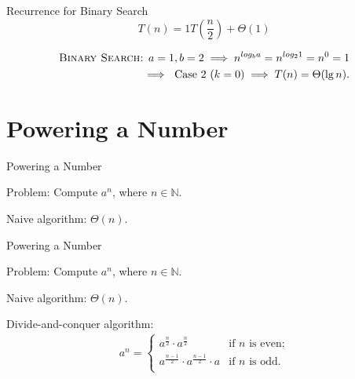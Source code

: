 \documentclass{beamer}
\begin{document}
\begin{frame}{Recurrence for Binary Search}
    $$
        T(n) = 1T\left(\frac{n}{2}\right) + \Theta(1)
    $$
    \vspace{20mm}
    \begin{align*}
        \text{\textsc{Binary Search:} } a = 1, b = 2 \implies n^{log_b a} = n^{log_2 1} = n^0 = 1 \\ \implies \text{ Case 2 } (k = 0) \implies T(n) = \Theta(\lg n) \text{.}
    \end{align*}
\end{frame}

\section{Powering a Number}

\begin{frame}{Powering a Number}
    \begin{exampleblock}{Problem:}
        Compute $a^n$, where $n \in \mathbb{N}$.
    \end{exampleblock}
    \begin{exampleblock}{Naive algorithm:}
        $\Theta(n)$.
    \end{exampleblock}
\end{frame}

\begin{frame}{Powering a Number}
    \begin{exampleblock}{Problem:}
        Compute $a^n$, where $n \in \mathbb{N}$.
    \end{exampleblock}
    \begin{exampleblock}{Naive algorithm:}
        $\Theta(n)$.
    \end{exampleblock}
    \begin{exampleblock}{Divide-and-conquer algorithm:}
        \Large
        \begin{align*}
            a^n =
                \begin{cases}
                    a^{\frac{n}{2}} \cdot a^{\frac{n}{2}} & \text{if $n$ is even;}\\
                    a^{\frac{n - 1}{2}} \cdot a^{\frac{n - 1}{2}} \cdot a & \text{if $n$ is odd.}\\
                \end{cases}
        \end{align*}
    \end{exampleblock}
\end{frame}
\end{document}
